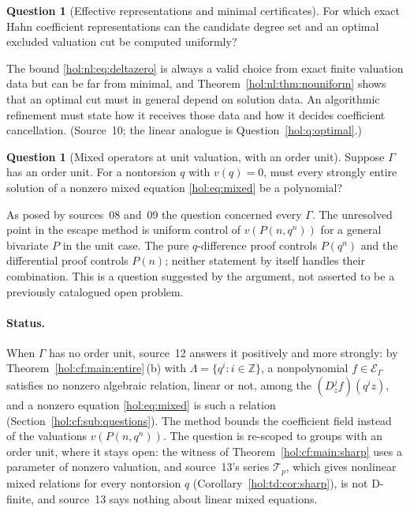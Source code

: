 \documentclass[11pt]{article}
\numberwithin{equation}{section}
\theoremstyle{definition}
\newtheorem{question}[theorem]{Question}
\theoremstyle{remark}
\newcommand{\Z}{\mathbb Z}
\newcommand{\E}{\mathcal E_\Gamma}
\begin{document}
\begin{question}[Effective representations and minimal certificates]
\label{hol:nl:q:effective}
For which exact Hahn coefficient representations can the candidate degree set
and an optimal excluded valuation cut be computed uniformly?
\end{question}

The bound \eqref{hol:nl:eq:deltazero} is always a valid choice from exact
finite valuation data but can be far from minimal, and
Theorem~\ref{hol:nl:thm:nouniform} shows that an optimal cut must in general
depend on solution data. An algorithmic refinement must state how it receives
those data and how it decides coefficient cancellation. (Source~10; the
linear analogue is Question~\ref{hol:q:optimal}.)

\begin{question}[Mixed operators at unit valuation, with an order unit]
\label{hol:q:mixedunit}
Suppose $\Gamma$ has an order unit. For a nontorsion $q$ with $v(q)=0$, must
every strongly entire solution of a nonzero mixed equation
\eqref{hol:eq:mixed} be a polynomial?
\end{question}

As posed by sources~08 and~09 the question concerned every $\Gamma$. The
unresolved point in the escape method is uniform control of $v(P(n,q^n))$ for
a general bivariate $P$ in the unit case. The pure $q$-difference proof
controls $P(q^n)$ and the differential proof controls $P(n)$; neither
statement by itself handles their combination. This is a question suggested
by the argument, not asserted to be a previously catalogued open problem.

\paragraph{Status.}
When $\Gamma$ has no order unit, source~12 answers it positively and more
strongly: by Theorem~\ref{hol:cf:main:entire}\,(b) with
$\Lambda=\{q^i:i\in\Z\}$, a nonpolynomial $f\in\E$ satisfies no nonzero
algebraic relation, linear or not, among the $(D_z^jf)(q^iz)$, and a nonzero
equation \eqref{hol:eq:mixed} is such a relation
(Section~\ref{hol:cf:sub:questions}). The method bounds the coefficient field
instead of the valuations $v(P(n,q^n))$. The question is re-scoped to groups
with an order unit, where it stays open: the witness of
Theorem~\ref{hol:cf:main:sharp} uses a parameter of nonzero valuation, and
source~13's series $\mathcal T_p$, which gives nonlinear mixed relations for
every nontorsion $q$ (Corollary~\ref{hol:td:cor:sharp}), is not D-finite, and
source~13 says nothing about linear mixed equations.
\end{document}
